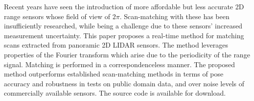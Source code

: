 Recent years have seen the introduction of more affordable but less accurate 2D
range sensors whose field of view of $2\pi$. Scan-matching with these has been
insufficiently researched, while being a challenge due to these sensors'
increased measurement uncertainty. This paper proposes a real-time method for
matching scans extracted from panoramic 2D LIDAR sensors. The method leverages
properties of the Fourier transform which arise due to the periodicity of the
range signal.  Matching is performed in a correspondenceless manner. The
proposed method outperforms established scan-matching methods in terms of pose
accuracy and robustness in tests on public domain data, and over noise levels
of commercially available sensors. The source code is available for download.
